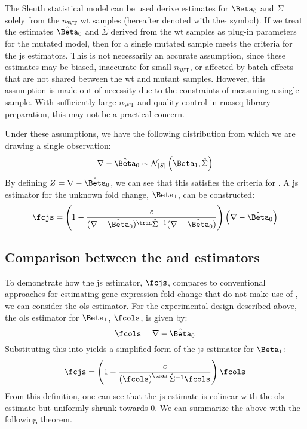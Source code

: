 The Sleuth statistical model can be used derive estimates for $\Beta_0$ and $\Sigma$ solely from the $n_\mathrm{WT}$ \gls{wt} samples (hereafter denoted with the $\hat{}$ symbol).
If we treat the estimates $\hat{\Beta}_0$ and $\hat{\Sigma}$ derived from the \gls{wt} samples as plug-in parameters for the mutated model, then  for a single mutated sample meets the criteria for the \gls{js} estimators.
This is not necessarily an accurate assumption, since these estimates may be biased, inaccurate for small $n_\mathrm{WT}$, or affected by batch effects that are not shared between the \gls{wt} and mutant samples.
However, this assumption is made out of necessity due to the constraints of measuring a single sample.
With sufficiently large $n_\mathrm{WT}$ and quality control in \gls{rnaseq} library preparation, this may not be a practical concern.

Under these assumptions, we have the following distribution from which we are drawing a single observation:
%
\begin{equation}
  \nabla - \hat{\Beta}_0 \sim \mathcal{N}_{|S|} \left( \Beta_1, \hat{\Sigma} \right)
  \label{eqn:delta_mut_js_dist}
\end{equation}
%
By defining $Z = \nabla - \hat{\Beta}_0$, we can see that this satisfies the criteria for .
A \gls{js} estimator for the unknown fold change, $\Beta_1$, can be constructed:
%
\begin{equation}
  \fcjs = \left( 1 - \frac{c}{(\nabla - \hat{\Beta}_0)^\tran \hat{\Sigma}^{-1} (\nabla - \hat{\Beta}_0)} \right) \left(\nabla - \hat{\Beta}_0 \right)
  \label{eqn:js_defn}
\end{equation}

\subsection{Comparison between the  and  estimators}

To demonstrate how the \gls{js} estimator, $\fcjs$, compares to conventional approaches for estimating gene expression fold change that do not make use of , we can consider the \gls{ols} estimator.
For the experimental design described above, the \gls{ols} estimator for $\Beta_1$, $\fcols$, is given by:
%
\begin{equation}
  \fcols = \nabla - \hat{\Beta}_0
  \label{eqn:ols_defn}
\end{equation}
%
Substituting this into  yields a simplified form of the \gls{js} estimator for $\Beta_1$:
%
\begin{equation}
  \fcjs = \left( 1 - \frac{c}{\left( \fcols \right)^\tran \hat{\Sigma}^{-1} \fcols} \right) \fcols
  \label{eqn:js_defn_ols}
\end{equation}
%
From this definition, one can see that the \gls{js} estimate is colinear with the \gls{ols} estimate but uniformly shrunk towards 0.
We can summarize the above with the following theorem.

